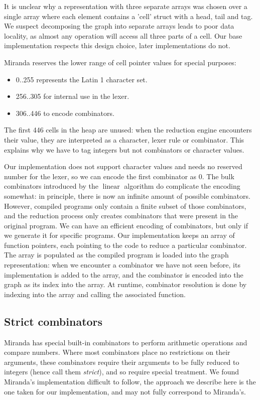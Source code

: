 \documentclass[conference]{IEEEtran}
\DeclareMathOperator{\linear}{linear}
\begin{document}
It is unclear why a representation with three separate arrays was chosen over a single array where each element contains a 'cell' struct with a head, tail and tag.
We suspect decomposing the graph into separate arrays leads to poor data locality, as almost any operation will access all three parts of a cell.
Our base implementation respects this design choice, later implementations do not.

Miranda reserves the lower range of cell pointer values for special purposes:
\begin{itemize}
    \item 0..255 represents the Latin 1 character set.
    \item 256..305 for internal use in the lexer.
    \item 306..446 to encode combinators.
\end{itemize}

The first 446 cells in the heap are unused: when the reduction engine encounters their value, they are interpreted as a character, lexer rule or combinator.
This explains why we have to tag integers but not combinators or character values.

Our implementation does not support character values and needs no reserved number for the lexer, so we can encode the first combinator as $0$.
The bulk combinators introduced by the $\linear$ algorithm do complicate the encoding somewhat:
in principle, there is now an infinite amount of possible combinators.
However, compiled programs only contain a finite subset of those combinators, and the reduction process only creates combinators that were present in the original program.
We can have an efficient encoding of combinators, but only if we generate it for specific programs.
Our implementation keeps an array of function pointers, each pointing to the code to reduce a particular combinator.
The array is populated as the compiled program is loaded into the graph representation:
when we encounter a combinator we have not seen before, its implementation is added to the array, and the combinator is encoded into the graph as its index into the array.
At runtime, combinator resolution is done by indexing into the array and calling the associated function.

\subsection{Strict combinators}
Miranda has special built-in combinators to perform arithmetic operations and compare numbers.
Where most combinators place no restrictions on their arguments, these combinators require their arguments to be fully reduced to integers (hence call them \textit{strict}), and so require special treatment.
We found Miranda's implementation difficult to follow, the approach we describe here is the one taken for our implementation, and may not fully correspond to Miranda's.
\end{document}
